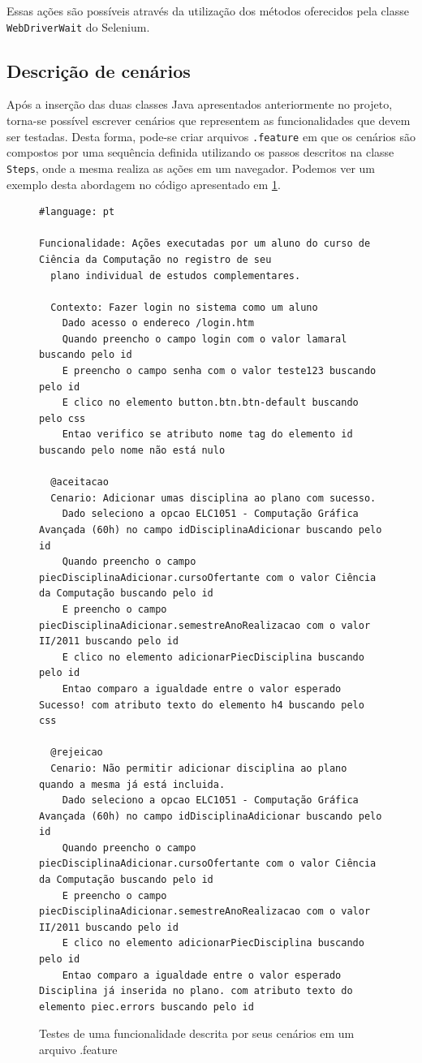 \documentclass[tg]{mdtufsm}
\begin{document}
Essas ações são possíveis através da utilização dos métodos oferecidos pela classe \texttt{WebDriverWait} do Selenium.

\subsection{Descrição de cenários}
Após a inserção das duas classes Java apresentados anteriormente no projeto, torna-se possível escrever cenários que representem as funcionalidades que devem ser testadas.
Desta forma, pode-se criar arquivos \texttt{.feature} em que os cenários são compostos por uma sequência definida utilizando os passos descritos na classe \texttt{Steps}, onde a mesma realiza as ações em um navegador.
Podemos ver um exemplo desta abordagem no código apresentado em \ref{code:feature}.

\begin{figure}[!htt]
	\begin{lstlisting}
#language: pt

Funcionalidade: Ações executadas por um aluno do curso de Ciência da Computação no registro de seu
  plano individual de estudos complementares.

  Contexto: Fazer login no sistema como um aluno
    Dado acesso o endereco /login.htm
    Quando preencho o campo login com o valor lamaral buscando pelo id
    E preencho o campo senha com o valor teste123 buscando pelo id
    E clico no elemento button.btn.btn-default buscando pelo css
    Entao verifico se atributo nome tag do elemento id buscando pelo nome não está nulo

  @aceitacao
  Cenario: Adicionar umas disciplina ao plano com sucesso.
    Dado seleciono a opcao ELC1051 - Computação Gráfica Avançada (60h) no campo idDisciplinaAdicionar buscando pelo id
    Quando preencho o campo piecDisciplinaAdicionar.cursoOfertante com o valor Ciência da Computação buscando pelo id
    E preencho o campo piecDisciplinaAdicionar.semestreAnoRealizacao com o valor II/2011 buscando pelo id
    E clico no elemento adicionarPiecDisciplina buscando pelo id
    Entao comparo a igualdade entre o valor esperado Sucesso! com atributo texto do elemento h4 buscando pelo css

  @rejeicao
  Cenario: Não permitir adicionar disciplina ao plano quando a mesma já está incluida.
    Dado seleciono a opcao ELC1051 - Computação Gráfica Avançada (60h) no campo idDisciplinaAdicionar buscando pelo id
    Quando preencho o campo piecDisciplinaAdicionar.cursoOfertante com o valor Ciência da Computação buscando pelo id
    E preencho o campo piecDisciplinaAdicionar.semestreAnoRealizacao com o valor II/2011 buscando pelo id
    E clico no elemento adicionarPiecDisciplina buscando pelo id
    Entao comparo a igualdade entre o valor esperado Disciplina já inserida no plano. com atributo texto do elemento piec.errors buscando pelo id
	\end{lstlisting}
	\caption{Testes de uma funcionalidade descrita por seus cenários em um arquivo .feature}
	\label{code:feature}
\end{figure}
\end{document}
